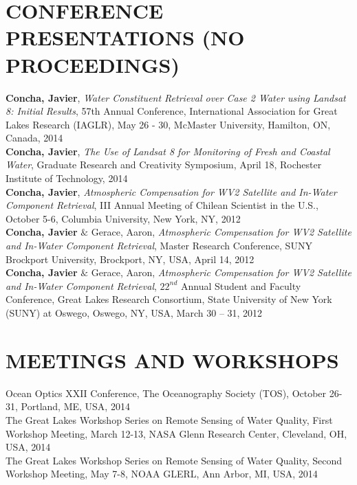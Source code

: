 \documentclass[11pt]{res} %
\begin{document}
\begin{resume}
\section{CONFERENCE PRESENTATIONS (NO PROCEEDINGS)}
\vspace{0.1in}
{\bf Concha, Javier}, {\it Water Constituent Retrieval over Case 2 Water using Landsat 8: Initial Results}, 57th Annual Conference, International Association for Great Lakes Research (IAGLR), May 26 - 30, McMaster University, Hamilton, ON, Canada, 2014
\vspace{0.1in}\\
{\bf Concha, Javier}, {\it The Use of Landsat 8 for Monitoring of Fresh and Coastal Water}, Graduate Research and Creativity Symposium, April 18, Rochester Institute of Technology, 2014
\vspace{0.1in}\\
{\bf Concha, Javier}, {\it Atmospheric Compensation for WV2 Satellite and In-Water Component Retrieval}, III Annual Meeting of Chilean Scientist in the U.S., October 5-6, Columbia University, New York, NY, 2012
\vspace{0.1in}\\
{\bf Concha, Javier} $\&$ Gerace, Aaron, {\it Atmospheric Compensation for WV2 Satellite and In-Water Component Retrieval}, Master Research Conference, SUNY Brockport University, Brockport, NY, USA, April 14, 2012
\vspace{0.1in}\\
{\bf Concha, Javier} $\&$ Gerace, Aaron, {\it Atmospheric Compensation for WV2 Satellite and In-Water Component Retrieval}, $22^{nd}$ Annual Student and Faculty Conference, Great Lakes Research Consortium, State University of New York (SUNY) at Oswego, Oswego, NY, USA, March 30 -- 31, 2012\\

\vspace{-0.2in}
\section{MEETINGS AND WORKSHOPS}
\vspace{0.1in}
Ocean Optics XXII Conference, The Oceanography Society (TOS),  October 26-31, Portland, ME, USA, 2014
\vspace{0.1in}\\
The Great Lakes Workshop Series on Remote Sensing of Water Quality, First Workshop Meeting, March 12-13, NASA Glenn Research Center, Cleveland, OH, USA, 2014
\vspace{0.1in}\\
The Great Lakes Workshop Series on Remote Sensing of Water Quality, Second Workshop Meeting, May 7-8, NOAA GLERL, Ann Arbor, MI, USA, 2014\\


\end{resume}
\end{document}
